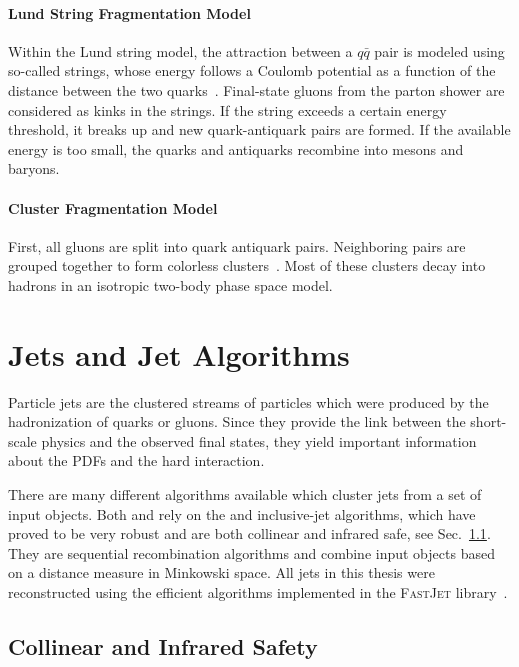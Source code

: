 \paragraph{Lund String Fragmentation Model}

Within the Lund string model, the attraction between a $q\bar q$ pair is
modeled using so-called strings, whose energy follows a Coulomb potential as a function
of the distance between the two quarks~\cite{Sjostrand:1984ic}. Final-state gluons from the parton
shower are considered as kinks in the strings. If the string exceeds a certain
energy threshold, it breaks up and new quark-antiquark pairs are formed. If the
available energy is too small, the quarks and antiquarks recombine into mesons
and baryons.

\paragraph{Cluster Fragmentation Model}

First, all gluons are split into quark antiquark pairs. Neighboring pairs are
grouped together to form colorless
clusters~\cite{Webber:1983if,Marchesini:1987cf}. Most of these clusters decay
into hadrons in an isotropic two-body phase space model.

\section{Jets and Jet Algorithms}
\label{sec:jet_algorithms}

Particle jets are the clustered streams of particles which were produced by the
hadronization of quarks or gluons. Since they provide the link between the
short-scale physics and the observed final states, they yield important
information about the PDFs and the hard interaction.

There are many different algorithms available which cluster jets
from a set of input objects. Both \CMS and \ATLAS rely on the \antikt and
inclusive-\kt jet algorithms, which have proved to be very robust and are both
collinear and infrared safe, see Sec.~\ref{sec:coll_safety}. They are
sequential recombination algorithms and combine input objects based on a
distance measure in Minkowski space. All jets in this thesis were reconstructed using the
efficient algorithms implemented in the \textsc{FastJet} library~\cite{Cacciari:2011ma}.

\subsection{Collinear and Infrared Safety}
\label{sec:coll_safety}

